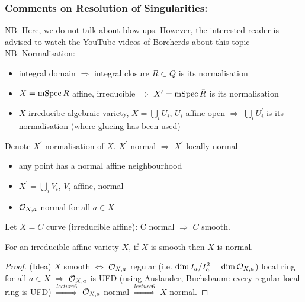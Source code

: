 \documentclass[a4paper,11pt]{article}
\begin{document}
			{\color{gray}\subsubsection*{Comments on Resolution of Singularities:}
			
				\noindent\underline{NB}: Here, we do not talk about blow-ups. However, the interested reader is advised to watch the YouTube videos of Borcherds about this topic
				\\

				\noindent\underline{NB}: Normalisation: 
				\begin{itemize}
					\item integral domain $\Longrightarrow$ integral closure $\bar{R}\subset Q$ is its normalisation
					\item $X=\operatorname{mSpec} R$ affine, irreducible $\Longrightarrow$ $X^\prime=\operatorname{mSpec}\bar{R}$ is its normalisation
					\item $X$ irreducibe algebraic variety, $X=\bigcup_iU_i$, $U_i$ affine open $\Longrightarrow$ $\bigcup_iU_i^\prime$ is its normalisation (where glueing has been used)
				\end{itemize}
				

				Denote $X^\prime$ normalisation of $X$. $X^\prime$ normal $\Longrightarrow$ $X^\prime$ locally normal
				\begin{itemize}
					\item any point has a normal affine neighbourhood
					\item $X^\prime=\bigcup_iV_i$, $V_i$ affine, normal
					\item $\mathcal{O}_{X,a}$ normal for all $a\in X$
				\end{itemize}

				Let $X=C$ curve (irreducible affine): C normal $\Longrightarrow$ $C$ smooth.

				\begin{prop}
					For an irreducible affine variety $X$, if $X$ is smooth then $X$ is normal.
				\end{prop}
				\begin{proof}\renewcommand{\qedsymbol}{}(Idea)
					$X$ smooth $\Longleftrightarrow$ $\mathcal{O}_{X,a}$ regular (i.e. $\dim I_a/I_a^2=\dim\mathcal{O}_{X,a}$) local ring for all $a\in X$ $\Longrightarrow$ $\mathcal{O}_{X,a}$ is UFD (using Auslander, Buchsbaum: every regular local ring is UFD) $\overset{lecture 6}{\Longrightarrow}$ $\mathcal{O}_{X,a}$ normal $\overset{lecture 6}{\Longrightarrow}$ $X$ normal.
				\end{proof}\renewcommand{\qedsymbol}{$\square$}

}
\end{document}
